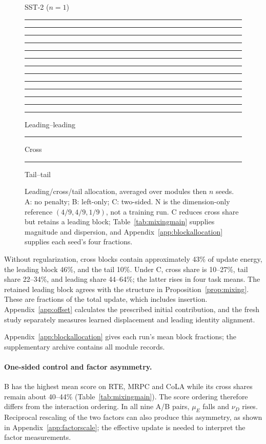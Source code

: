 \documentclass{article}
\newcommand{\allocationbar}[4]{\makebox[1em][l]{#1}\begingroup\setlength{\unitlength}{\dimexpr\linewidth-1em\relax}\textcolor{black!80}{\rule{#2\unitlength}{1.4ex}}\textcolor{black!45}{\rule{#3\unitlength}{1.4ex}}\textcolor{black!15}{\rule{#4\unitlength}{1.4ex}}\endgroup}
\begin{document}
\begin{figure}[t]
\begin{minipage}[t]{0.19\linewidth}
\end{minipage}
\hfill
\begin{minipage}[t]{0.19\linewidth}
\centering\small SST-2 ($n=1$)\par\smallskip
\allocationbar{A}{0.4651930}{0.4333157}{0.1014913}\par\smallskip
\allocationbar{B}{0.4875879}{0.4019357}{0.1104764}\par\smallskip
\allocationbar{C}{0.5573737}{0.1720633}{0.2705630}\par\smallskip
\allocationbar{N}{0.4444444}{0.4444444}{0.1111112}\par\smallskip
\end{minipage}
\par\smallskip
{\small\textcolor{black!80}{\rule{1em}{1ex}} Leading--leading\quad
\textcolor{black!45}{\rule{1em}{1ex}} Cross\quad
\textcolor{black!15}{\rule{1em}{1ex}} Tail--tail}
\caption{Leading/cross/tail allocation, averaged over modules then $n$ seeds. A: no penalty; B: left-only; C: two-sided. N is the dimension-only reference $(4/9,4/9,1/9)$, not a training run. C reduces cross share but retains a leading block; Table~\ref{tab:mixingmain} supplies magnitude and dispersion, and Appendix~\ref{app:blockallocation} supplies each seed's four fractions.}
\label{fig:allocation}
\end{figure}

Without regularization, cross blocks contain approximately 43\% of update energy, the leading block 46\%, and the tail 10\%. Under C, cross share is 10--27\%, tail share 22--34\%, and leading share 44--64\%; the latter rises in four task means. The retained leading block agrees with the structure in Proposition~\ref{prop:mixing}. These are fractions of the total update, which includes insertion. Appendix~\ref{app:offset} calculates the prescribed initial contribution, and the fresh study separately measures learned displacement and leading identity alignment.

Appendix~\ref{app:blockallocation} gives each run's mean block fractions; the supplementary archive contains all module records.

\paragraph{One-sided control and factor asymmetry.}
B has the highest mean score on RTE, MRPC and CoLA while its cross shares remain about 40--44\% (Table~\ref{tab:mixingmain}). The score ordering therefore differs from the interaction ordering. In all nine A/B pairs, $\mu_E$ falls and $\nu_D$ rises. Reciprocal rescaling of the two factors can also produce this asymmetry, as shown in Appendix~\ref{app:factorscale}; the effective update is needed to interpret the factor measurements.
\end{document}
